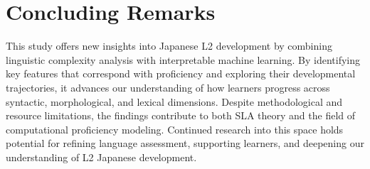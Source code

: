 \section{Concluding Remarks}

This study offers new insights into Japanese L2 development by combining linguistic complexity analysis with
interpretable machine learning. By identifying key features that correspond with proficiency and exploring their
developmental trajectories, it advances our understanding of how learners progress across syntactic, morphological,
and lexical dimensions. Despite methodological and resource limitations, the findings contribute to both SLA theory
and the field of computational proficiency modeling. Continued research into this space holds potential for
refining language assessment, supporting learners, and deepening our understanding of L2 Japanese development.

